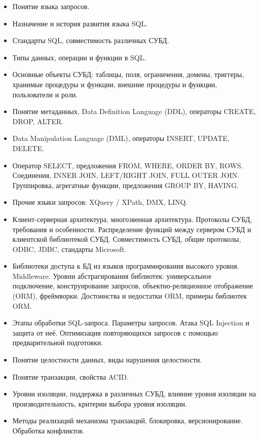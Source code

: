 \documentclass[a4paper]{article}
\begin{document}
\begin{itemize}
  \item Понятие языка запросов.
  \item Назначение и история развития языка SQL.
  \item Стандарты SQL, совместимость различных СУБД.
  \item Типы данных, операции и функции в SQL.
  \item Основные объекты СУБД: таблицы, поля, ограничения, домены, триггеры,
    хранимые процедуры и функции, внешние процедуры и функции, пользователи и роли.
  \item Понятие метаданных, Data Definition Language (DDL), операторы CREATE, DROP, ALTER.
  \item Data Manipulation Language (DML), операторы INSERT, UPDATE, DELETE.
  \item Оператор SELECT, предложения FROM, WHERE, ORDER BY, ROWS.
    Соединения, INNER JOIN, LEFT/RIGHT JOIN, FULL OUTER JOIN. Группировка, агрегатные функции, предложения GROUP BY, HAVING.
  \item Прочие языки запросов: XQuery / XPath, DMX, LINQ.
\end{itemize}

\begin{itemize}
  \item Клиент-серверная архитектура, многозвенная архитектура. Протоколы СУБД, требования и особенности.
    Распределение функций между сервером СУБД и клиентской библиотекой СУБД.
    Совместимость СУБД, общие протоколы, ODBC, JDBC, стандарты Microsoft.
  \item Библиотеки доступа к БД из языков программирования высокого уровня. Middleware.
    Уровни абстрагирования библиотек: универсальное подключение, конструирование запросов,
    объектно-реляционное отображение (ORM), фреймворки. Достоинства и недостатки ORM, примеры библиотек ORM.
  \item Этапы обработки SQL-запроса. Параметры запросов. Атака SQL Injection и защита от неё.
    Оптимизация повторяющихся запросов с помощью предварительной подготовки.
\end{itemize}

\begin{itemize}
  \item Понятие целостности данных, виды нарушения целостности.
  \item Понятие транзакции, свойства ACID.
  \item Уровни изоляции, поддержка в различных СУБД,
    влияние уровня изоляции на производительность, критерии выбора уровня изоляции.
  \item Методы реализаций механизма транзакций, блокировка, версионирование. Обработка конфликтов.
\end{itemize}
\end{document}
